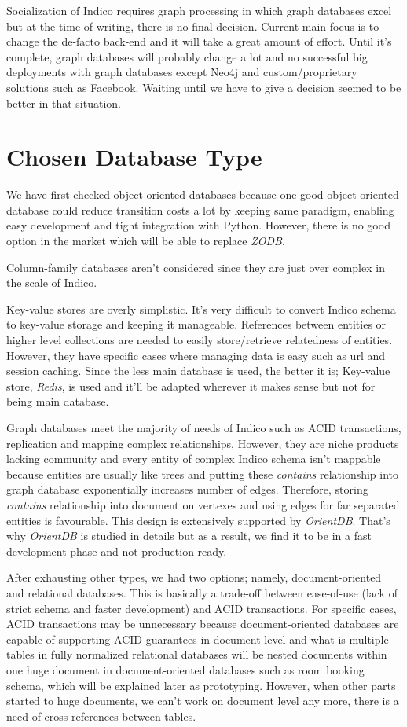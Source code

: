 Socialization of Indico requires graph processing in which graph databases excel but at the time of writing, there is no final decision. Current main focus is to change the de-facto back-end and it will take a great amount of effort. Until it's complete, graph databases will probably change a lot and no successful big deployments with graph databases except Neo4j and custom/proprietary solutions such as Facebook. Waiting until we have to give a decision seemed to be better in that situation.

\section{Chosen Database Type}

We have first checked object-oriented databases because one good object-oriented database could reduce transition costs a lot by keeping same paradigm, enabling easy development and tight integration with Python. However, there is no good option in the market which will be able to replace \textit{ZODB}.

Column-family databases aren't considered since they are just over complex in the scale of Indico.

Key-value stores are overly simplistic. It's very difficult to convert Indico schema to key-value storage and keeping it manageable. References between entities or higher level collections are needed to easily store/retrieve relatedness of entities. However, they have specific cases where managing data is easy such as url and session caching. Since the less main database is used, the better it is; Key-value store, \textit{Redis}, is used and it'll be adapted wherever it makes sense but not for being main database.

Graph databases meet the majority of needs of Indico such as ACID transactions, replication and mapping complex relationships. However, they are niche products lacking community and every entity of complex Indico schema isn't mappable because entities are usually like trees and putting these \textit{contains} relationship into graph database exponentially increases number of edges. Therefore, storing \textit{contains} relationship into document on vertexes and using edges for far separated entities is favourable. This design is extensively supported by \textit{OrientDB}. That's why \textit{OrientDB} is studied in details but as a result, we find it to be in a fast development phase and not production ready. 

After exhausting other types, we had two options; namely, document-oriented and relational databases. This is basically a trade-off between ease-of-use (lack of strict schema and faster development) and ACID transactions. For specific cases, ACID transactions may be unnecessary because document-oriented databases are capable of supporting ACID guarantees in document level and what is multiple tables in fully normalized relational databases will be nested documents within one huge document in document-oriented databases such as room booking schema, which will be explained later as prototyping. However, when other parts started to huge documents, we can't work on document level any more, there is a need of cross references between tables.

